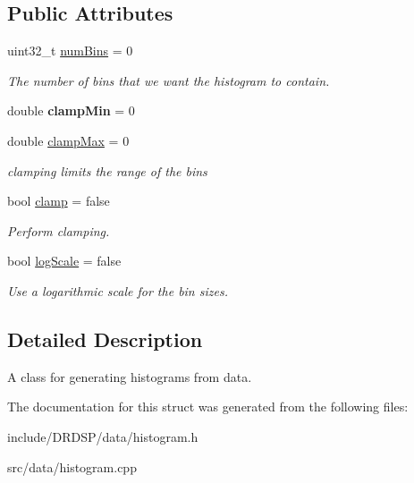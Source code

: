 \subsection*{Public Attributes}
\begin{DoxyCompactItemize}
\item 
\hypertarget{struct_d_r_d_s_p_1_1_histogram_generator_a2f6b01668e743ce436f54c3ca56275a1}{uint32\-\_\-t \hyperlink{struct_d_r_d_s_p_1_1_histogram_generator_a2f6b01668e743ce436f54c3ca56275a1}{num\-Bins} = 0}\label{struct_d_r_d_s_p_1_1_histogram_generator_a2f6b01668e743ce436f54c3ca56275a1}

\begin{DoxyCompactList}\small\item\em The number of bins that we want the histogram to contain. \end{DoxyCompactList}\item 
\hypertarget{struct_d_r_d_s_p_1_1_histogram_generator_aef85198c4644dbcfa27d24e9015bb025}{double {\bfseries clamp\-Min} = 0}\label{struct_d_r_d_s_p_1_1_histogram_generator_aef85198c4644dbcfa27d24e9015bb025}

\item 
\hypertarget{struct_d_r_d_s_p_1_1_histogram_generator_a5cec8e7e75d95a66b4a17c3f70c2b556}{double \hyperlink{struct_d_r_d_s_p_1_1_histogram_generator_a5cec8e7e75d95a66b4a17c3f70c2b556}{clamp\-Max} = 0}\label{struct_d_r_d_s_p_1_1_histogram_generator_a5cec8e7e75d95a66b4a17c3f70c2b556}

\begin{DoxyCompactList}\small\item\em clamping limits the range of the bins \end{DoxyCompactList}\item 
\hypertarget{struct_d_r_d_s_p_1_1_histogram_generator_a12fe0ce6860a6f8bd17b1355f91c0ac6}{bool \hyperlink{struct_d_r_d_s_p_1_1_histogram_generator_a12fe0ce6860a6f8bd17b1355f91c0ac6}{clamp} = false}\label{struct_d_r_d_s_p_1_1_histogram_generator_a12fe0ce6860a6f8bd17b1355f91c0ac6}

\begin{DoxyCompactList}\small\item\em Perform clamping. \end{DoxyCompactList}\item 
\hypertarget{struct_d_r_d_s_p_1_1_histogram_generator_a84935b50902a985afdeca6541bac8c06}{bool \hyperlink{struct_d_r_d_s_p_1_1_histogram_generator_a84935b50902a985afdeca6541bac8c06}{log\-Scale} = false}\label{struct_d_r_d_s_p_1_1_histogram_generator_a84935b50902a985afdeca6541bac8c06}

\begin{DoxyCompactList}\small\item\em Use a logarithmic scale for the bin sizes. \end{DoxyCompactList}\end{DoxyCompactItemize}


\subsection{Detailed Description}
A class for generating histograms from data. 

The documentation for this struct was generated from the following files\-:\begin{DoxyCompactItemize}
\item 
include/\-D\-R\-D\-S\-P/data/histogram.\-h\item 
src/data/histogram.\-cpp\end{DoxyCompactItemize}
